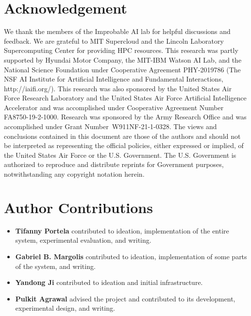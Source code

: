 \section*{Acknowledgement}
\footnotesize{
We thank the members of the Improbable AI lab for helpful discussions and feedback. We are grateful to MIT Supercloud and the Lincoln Laboratory Supercomputing Center for providing HPC resources. This research was partly supported by Hyundai Motor Company, the MIT-IBM Watson AI Lab, and the National Science Foundation under Cooperative Agreement PHY-2019786 (The NSF AI Institute for Artificial Intelligence and Fundamental Interactions, http://iaifi.org/). This research was also sponsored by the United States Air Force Research Laboratory and the United States Air Force Artificial Intelligence Accelerator and was accomplished under Cooperative Agreement Number FA8750-19-2-1000. Research was sponsored by the Army Research Office and was accomplished under Grant Number W911NF-21-1-0328. The views and conclusions contained in this document are those of the authors and should not be interpreted as representing the official policies, either expressed or implied, of the United States Air Force or the U.S. Government. The U.S. Government is authorized to reproduce and distribute reprints for Government purposes, notwithstanding any copyright notation herein.
}

\section*{Author Contributions}
\small{
\begin{itemize}\item \textbf{Tifanny Portela} contributed to ideation, implementation of the entire system, experimental evaluation, and writing.
\item \textbf{Gabriel B. Margolis} contributed to ideation, implementation of some parts of the system, and writing.
\item \textbf{Yandong Ji} contributed to ideation and initial infrastructure.
\item \textbf{Pulkit Agrawal} advised the project and contributed to its
development, experimental design, and writing.
\end{itemize}
}





{}



